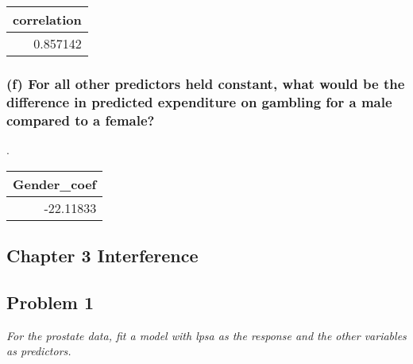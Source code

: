 \documentclass[
]{article}
\newenvironment{Shaded}{\begin{snugshade}}{\end{snugshade}}
\newcommand{\DataTypeTok}[1]{\textcolor[rgb]{0.13,0.29,0.53}{#1}}
\newcommand{\KeywordTok}[1]{\textcolor[rgb]{0.13,0.29,0.53}{\textbf{#1}}}
\newcommand{\NormalTok}[1]{#1}
\newcommand{\OperatorTok}[1]{\textcolor[rgb]{0.81,0.36,0.00}{\textbf{#1}}}
\newcommand{\StringTok}[1]{\textcolor[rgb]{0.31,0.60,0.02}{#1}}
\begin{document}
\captionsetup[table]{labelformat=empty,skip=1pt}
\begin{longtable}{r}
\toprule
correlation \\ 
\midrule
0.857142 \\ 
\bottomrule
\end{longtable}

\hypertarget{f-for-all-other-predictors-held-constant-what-would-be-the-difference-in-predicted-expenditure-on-gambling-for-a-male-compared-to-a-female}{%
\subsubsection{(f) For all other predictors held constant, what would be
the difference in predicted expenditure on gambling for a male compared
to a
female?}\label{f-for-all-other-predictors-held-constant-what-would-be-the-difference-in-predicted-expenditure-on-gambling-for-a-male-compared-to-a-female}}

.

\begin{Shaded}
\end{Shaded}

\captionsetup[table]{labelformat=empty,skip=1pt}
\begin{longtable}{r}
\toprule
Gender\_coef \\ 
\midrule
-22.11833 \\ 
\bottomrule
\end{longtable}

\hypertarget{chapter-3-interference}{%
\subsection{Chapter 3 Interference}\label{chapter-3-interference}}

\hypertarget{problem-1-1}{%
\subsection{Problem 1}\label{problem-1-1}}

\emph{For the prostate data, fit a model with lpsa as the response and
the other variables as predictors.}
\end{document}
